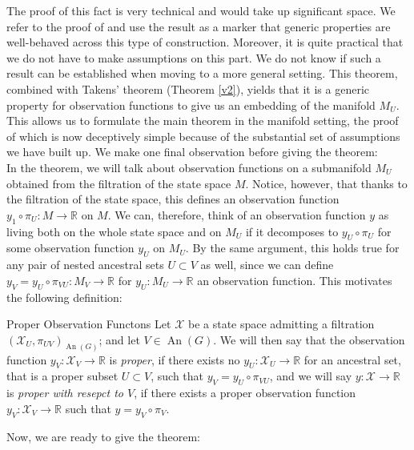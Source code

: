 \documentclass[11pt, a4paper]{memoir}
\theoremstyle{break}
\theoremstyle{break}
\theoremstyle{nonumberplain}
\newcommand{\mR}{\mathbb{R}}
\DeclareMathOperator{\an}{An}
\begin{document}
The proof of this fact is very technical and would take up significant space. We refer to the proof of \cite{mathFound} and use the result as a marker that generic properties are well-behaved across this type of construction. Moreover, it is quite practical that we do not have to make assumptions on this part. We do not know if such a result can be established when moving to a more general setting. This theorem, combined with Takens' theorem (Theorem \ref{v2}), yields that it is a generic property for observation functions to give us an embedding of the manifold $M_U$. This allows us to formulate the main theorem in the manifold setting, the proof of which is now deceptively simple because of the substantial set of assumptions we have built up. We make one final observation before giving the theorem:\\[5pt]
In the theorem, we will talk about observation functions on a submanifold $M_U$ obtained from the filtration of the state space $M$. Notice, however, that thanks to the filtration of the state space, this defines an observation function $y_1\circ\pi_U:M\to \mR$ on $M$. We can, therefore, think of an observation function $y$ as living both on the whole state space and on $M_U$ if it decomposes to $y_U\circ \pi_{U}$ for some observation function $y_U$ on $M_U$. By the same argument, this holds true for any pair of nested ancestral sets $U\subset V$ as well, since we can define $y_V=y_U\circ \pi_{VU}:M_V\to \mR$ for $y_U:M_U\to \mR$ an observation function. This motivates the following definition:
\begin{mydefinition}{Proper Observation Functons}
Let $\mathcal{X}$ be a state space admitting a filtration $(\mathcal{X}_U, \pi_{UV})_{\an(G)}$; and let $V\in \an(G)$. We will then say that the observation function $y_V:\mathcal{X}_V\to \mR$ is \emph{proper}, if there exists no $y_U:\mathcal{X}_U\to \mR$ for an ancestral set, that is a proper subset $U\subset V$, such that $y_V=y_U\circ\pi_{VU}$, and we will say $y:\mathcal{X}\to \mR$ is \emph{proper with resepct to $V$}, if there exists a proper observation function $y_V:\mathcal{X}_V\to \mR$ such that $y=y_V\circ\pi_V$.
\end{mydefinition}
Now, we are ready to give the theorem:
\end{document}
